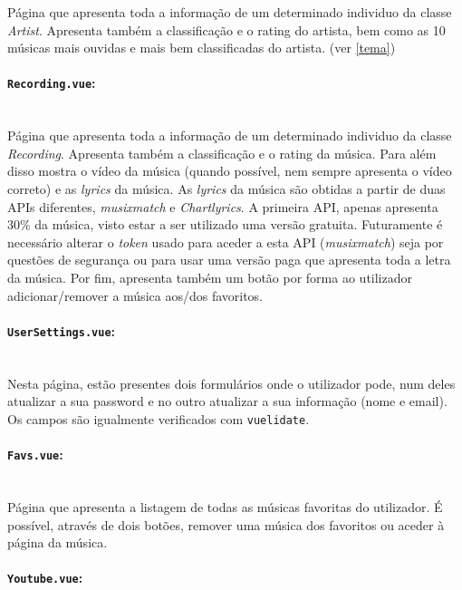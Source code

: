 \documentclass{article}
\begin{document}
Página que apresenta toda a informação de um determinado individuo da classe \textit{Artist}. Apresenta também a classificação e o rating do artista, bem como as 10 músicas mais ouvidas e mais bem classificadas do artista. (ver \ref{tema})

\paragraph{\texttt{Recording.vue}:}\mbox{}\\

Página que apresenta toda a informação de um determinado individuo da classe \textit{Recording}. Apresenta também a classificação e o rating da música. Para além disso mostra o vídeo da música (quando possível, nem sempre apresenta o vídeo correto) e as \textit{lyrics} da música. As \textit{lyrics} da música são obtidas a partir de duas APIs diferentes, \textit{musixmatch} e \textit{Chartlyrics}. A primeira API, apenas apresenta 30\% da música, visto estar a ser utilizado uma versão gratuita. Futuramente é necessário alterar o \textit{token} usado para aceder a esta API (\textit{musixmatch}) seja por questões de segurança ou para usar uma versão paga que apresenta toda a letra da música. Por fim, apresenta também um botão por forma ao utilizador adicionar/remover a música aos/dos favoritos.

\paragraph{\texttt{UserSettings.vue}:}\mbox{}\\

Nesta página, estão presentes dois formulários onde o utilizador pode, num deles atualizar a sua password e no outro atualizar a sua informação (nome e email). Os campos são igualmente verificados com \texttt{vuelidate}.

\paragraph{\texttt{Favs.vue}:}\mbox{}\\

Página que apresenta a listagem de todas as músicas favoritas do utilizador. É possível, através de dois botões, remover uma música dos favoritos ou aceder à página da música.

\paragraph{\texttt{Youtube.vue}:}\mbox{}\\
\end{document}
